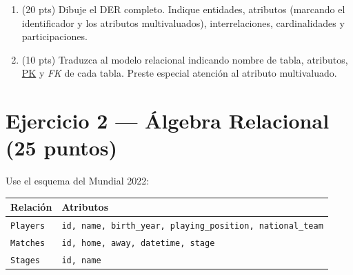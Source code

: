 \documentclass[11pt,a4paper]{article}
\begin{document}
\begin{enumerate}
  \item (20 pts) Dibuje el DER completo. Indique entidades, atributos (marcando el identificador y los atributos multivaluados), interrelaciones, cardinalidades y participaciones.
  \vspace{10cm}
  \item (10 pts) Traduzca al modelo relacional indicando nombre de tabla, atributos, \underline{PK} y \textit{FK} de cada tabla. Preste especial atención al atributo multivaluado.
\end{enumerate}

\newpage

\section*{Ejercicio 2 — Álgebra Relacional \hfill\normalfont(25 puntos)}

Use el esquema del Mundial 2022:

\begin{center}
\begin{tabular}{ll}
\toprule
\textbf{Relación} & \textbf{Atributos} \\
\midrule
\texttt{Players} & \texttt{id, name, birth\_year, playing\_position, national\_team} \\
\texttt{Matches}  & \texttt{id, home, away, datetime, stage} \\
\texttt{Stages}   & \texttt{id, name} \\
\bottomrule
\end{tabular}
\end{center}
\end{document}

